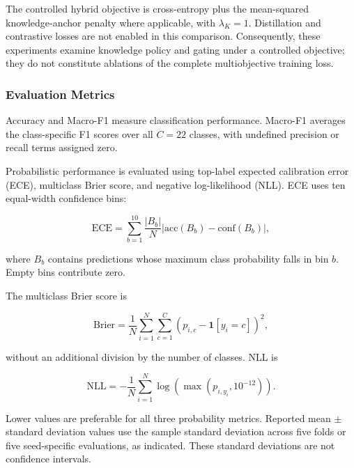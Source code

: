 The controlled hybrid objective is cross-entropy plus the
mean-squared knowledge-anchor penalty where applicable, with
$\lambda_K=1$. Distillation and contrastive losses are not enabled
in this comparison. Consequently, these experiments examine knowledge
policy and gating under a controlled objective; they do not constitute
ablations of the complete multiobjective training loss.

\subsubsection{Evaluation Metrics}

Accuracy and Macro-F1 measure classification performance.
Macro-F1 averages the class-specific F1 scores over all $C=22$
classes, with undefined precision or recall terms assigned zero.

Probabilistic performance is evaluated using top-label expected
calibration error (ECE), multiclass Brier score, and negative
log-likelihood (NLL). ECE uses ten equal-width confidence bins:

\begin{equation}
\mathrm{ECE}
=
\sum_{b=1}^{10}
\frac{|B_b|}{N}
\left|
\mathrm{acc}(B_b)-\mathrm{conf}(B_b)
\right|,
\label{eq:results_ece}
\end{equation}

where $B_b$ contains predictions whose maximum class probability
falls in bin $b$. Empty bins contribute zero.

The multiclass Brier score is

\begin{equation}
\mathrm{Brier}
=
\frac{1}{N}
\sum_{i=1}^{N}
\sum_{c=1}^{C}
\left(p_{i,c}-\mathbf{1}[y_i=c]\right)^2,
\label{eq:results_brier}
\end{equation}

without an additional division by the number of classes. NLL is

\begin{equation}
\mathrm{NLL}
=
-\frac{1}{N}
\sum_{i=1}^{N}
\log\!\left(\max(p_{i,y_i},10^{-12})\right).
\label{eq:results_nll}
\end{equation}

Lower values are preferable for all three probability metrics.
Reported mean $\pm$ standard deviation values use the sample
standard deviation across five folds or five seed-specific
evaluations, as indicated. These standard deviations are not
confidence intervals.

